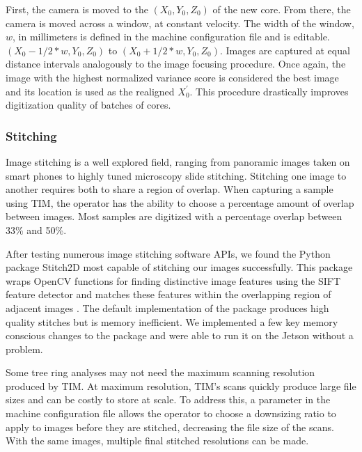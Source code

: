 \documentclass[a4paper,12pt]{article}
\begin{document}
First, the camera is moved to the $(X_0, Y_0, Z_0)$ of the new core. 
From there, the camera is moved across a window, at constant velocity. %
The width of the window, $w$, in millimeters is defined in the machine configuration file and is editable. %
$(X_0 - 1/2*{w}, Y_0, Z_0)$ to $(X_0 + 1/2*{w}, Y_0, Z_0)$. 
Images are captured at equal distance intervals analogously to the image focusing procedure. 
Once again, the image with the highest normalized variance score is considered the best image and its location is used as the realigned $X_0^\prime$.
This procedure drastically improves digitization quality of batches of cores.

\subsubsection{Stitching}

Image stitching is a well explored field, ranging from panoramic images taken on smart phones to highly tuned microscopy slide stitching. 
Stitching one image to another requires both to share a region of overlap. When capturing a sample using TIM, the operator has the ability to choose a percentage amount of overlap between images.
Most samples are digitized with a percentage overlap between 33\% and 50\%.

After testing numerous image stitching software APIs, we found the Python package Stitch2D most capable of stitching our images successfully. %
This package wraps OpenCV functions for finding distinctive image features using the SIFT feature detector and matches these features within the overlapping region of adjacent images \citep{lowe_distinctive_2004}. 
The default implementation of the package produces high quality stitches but is memory inefficient. %
We implemented a few key memory conscious changes to the package and were able to run it on the Jetson without a problem. 

Some tree ring analyses may not need the maximum scanning resolution produced by TIM. At maximum resolution, TIM's scans quickly produce large file sizes and can be costly to store at scale. 
To address this, a parameter in the machine configuration file allows the operator to choose a downsizing ratio to apply to images before they are stitched, decreasing the file size of the scans.
With the same images, multiple final stitched resolutions can be made. 
\end{document}
